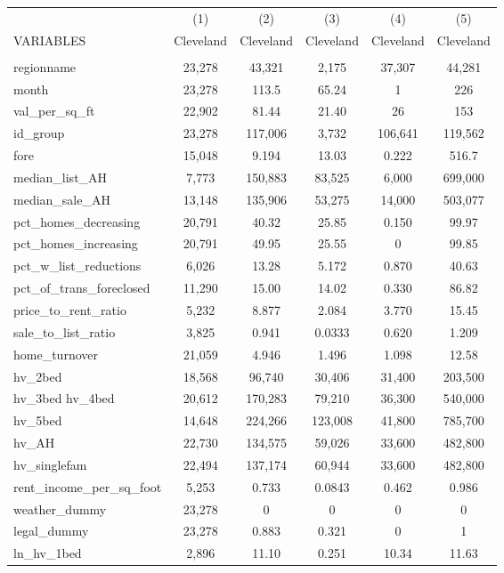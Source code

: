 \begin{tabular}{lccccc} \hline
 & (1) & (2) & (3) & (4) & (5) \\
VARIABLES & Cleveland & Cleveland & Cleveland & Cleveland & Cleveland \\ \hline
 &  &  &  &  &  \\
regionname & 23,278 & 43,321 & 2,175 & 37,307 & 44,281 \\
month & 23,278 & 113.5 & 65.24 & 1 & 226 \\
val\_per\_sq\_ft & 22,902 & 81.44 & 21.40 & 26 & 153 \\
id\_group & 23,278 & 117,006 & 3,732 & 106,641 & 119,562 \\
fore & 15,048 & 9.194 & 13.03 & 0.222 & 516.7 \\
median\_list\_AH & 7,773 & 150,883 & 83,525 & 6,000 & 699,000 \\
median\_sale\_AH & 13,148 & 135,906 & 53,275 & 14,000 & 503,077 \\
pct\_homes\_decreasing & 20,791 & 40.32 & 25.85 & 0.150 & 99.97 \\
pct\_homes\_increasing & 20,791 & 49.95 & 25.55 & 0 & 99.85 \\
pct\_w\_list\_reductions & 6,026 & 13.28 & 5.172 & 0.870 & 40.63 \\
pct\_of\_trans\_foreclosed & 11,290 & 15.00 & 14.02 & 0.330 & 86.82 \\
price\_to\_rent\_ratio & 5,232 & 8.877 & 2.084 & 3.770 & 15.45 \\
sale\_to\_list\_ratio & 3,825 & 0.941 & 0.0333 & 0.620 & 1.209 \\
home\_turnover & 21,059 & 4.946 & 1.496 & 1.098 & 12.58 \\
hv\_2bed & 18,568 & 96,740 & 30,406 & 31,400 & 203,500 \\
hv\_3bed 
hv\_4bed & 20,612 & 170,283 & 79,210 & 36,300 & 540,000 \\
hv\_5bed & 14,648 & 224,266 & 123,008 & 41,800 & 785,700 \\
hv\_AH & 22,730 & 134,575 & 59,026 & 33,600 & 482,800 \\
hv\_singlefam & 22,494 & 137,174 & 60,944 & 33,600 & 482,800 \\
rent\_income\_per\_sq\_foot & 5,253 & 0.733 & 0.0843 & 0.462 & 0.986 \\
weather\_dummy & 23,278 & 0 & 0 & 0 & 0 \\
legal\_dummy & 23,278 & 0.883 & 0.321 & 0 & 1 \\
ln\_hv\_1bed & 2,896 & 11.10 & 0.251 & 10.34 & 11.63 \\

\end{tabular}
